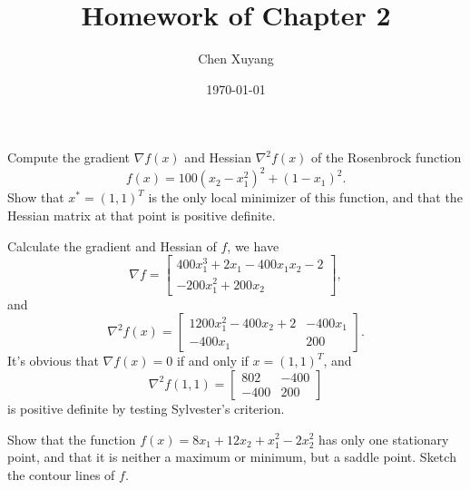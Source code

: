 \documentclass[lineno]{assignment}
\title{Homework of Chapter 2}
\author{Chen Xuyang}
\date{\today}
\institute{School of Mathematical Science}
\theoremstyle{plain}
\begin{document}
    \maketitle

    \begin{problem}
        Compute the gradient $\nabla f(x)$ and Hessian $\nabla^{2}f(x)$ of the Rosenbrock function
        \begin{equation}
            f(x)=100(x_{2}-x_{1}^{2})^{2}+(1-x_{1})^{2}.
        \end{equation}
        Show that $x^{*}=(1,1)^{T}$ is the only local minimizer of this function, and that the Hessian matrix at that point is positive definite.
    \end{problem}
    \begin{solution}
        Calculate the gradient and Hessian of $f$, we have
        \begin{equation}
            \nabla f =
            \begin{bmatrix}
                400x_1^3+2x_1-400x_1x_2-2\\
                -200x_1^2+200x_2
            \end{bmatrix},
        \end{equation}
        and
        \begin{equation}
            \nabla^{2}f(x) =
            \begin{bmatrix}
                1200x_1^2-400x_2+2 & -400x_1\\
                -400x_1 & 200
            \end{bmatrix}.
        \end{equation}
        It's obvious that $\nabla f(x)=0$ if and only if $x=(1,1)^{T}$, and
        \begin{equation}
            \nabla^{2}f(1, 1) =
            \begin{bmatrix}
                802 & -400\\
                -400 & 200
            \end{bmatrix}
        \end{equation}
        is positive definite by testing Sylvester's criterion.
    \end{solution}
    \begin{problem}
        Show that the function $f(x)=8x_1+12x_2+x_1^2-2x_2^2$ has only one stationary point, and that it is neither a maximum or minimum, but a saddle point. Sketch the contour lines of $f$.
    \end{problem}
\end{document}
